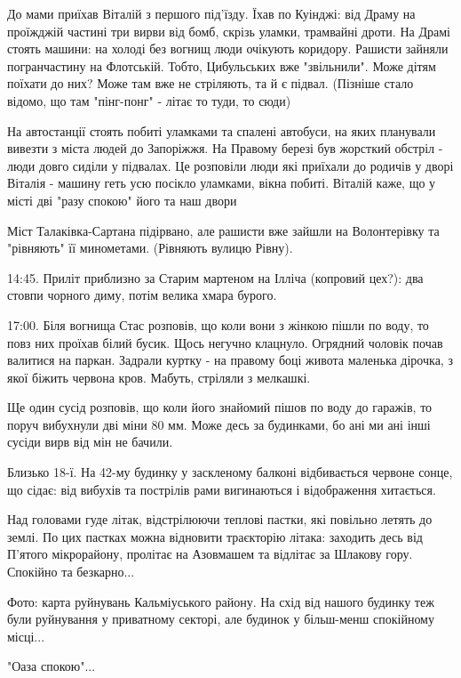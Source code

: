 До мами приїхав Віталій з першого під'їзду. Їхав по Куінджі: від Драму на
проїжджій частині три вирви від бомб, скрізь уламки, трамвайні дроти. На Драмі
стоять машини: на холоді без вогнищ люди очікують коридору. Рашисти зайняли
погранчастину на Флотській. Тобто, Цибульських вже "звільнили". Може дітям
поїхати до них? Може там вже не стріляють, та й є підвал. (Пізніше стало
відомо, що там "пінг-понг" - літає то туди, то сюди) 

На автостанції стоять побиті уламками та спалені автобуси, на яких планували
вивезти з міста людей до Запоріжжя. На Правому березі був жорсткий обстріл -
люди довго сиділи у підвалах. Це розповіли люди які приїхали до родичів у дворі
Віталія  - машину геть усю посікло уламками, вікна побиті. Віталій каже, що у
місті дві "разу спокою" його та наш двори 

Міст Талаківка-Сартана підірвано, але рашисти вже зайшли на Волонтерівку та
"рівняють" її минометами. (Рівняють вулицю Рівну).

14:45. Приліт приблизно за Старим мартеном на Ілліча (копровий цех?): два
стовпи чорного диму, потім велика хмара бурого.

17:00. Біля вогнища Стас розповів, що коли вони з жінкою пішли по воду, то повз
них проїхав білий бусик. Щось негучно клацнуло. Огрядний чоловік почав валитися
на паркан. Задрали куртку - на правому боці живота маленька дірочка, з якої
біжить червона кров. Мабуть, стріляли з мелкашкі.

Ще один сусід розповів, що коли його знайомий пішов по воду до гаражів, то
поруч вибухнули дві міни 80 мм. Може десь за будинками, бо ані ми ані інші
сусіди вирв від мін не бачили.

Близько 18-ї. На 42-му будинку у заскленому балконі відбивається червоне
сонце, що сідає: від вибухів та пострілів рами вигинаються і відображення
хитається.

Над головами гуде літак, відстрілюючи теплові пастки, які повільно летять до
землі. По цих пастках можна відновити траєкторію літака: заходить десь від
П'ятого мікрорайону, пролітає на Азовмашем та відлітає за Шлакову гору.
Спокійно та безкарно...

Фото: карта руйнувань Кальміуського району. На схід від нашого будинку теж були
руйнування у приватному секторі, але будинок у більш-менш спокійному місці...

"Оаза спокою"...

